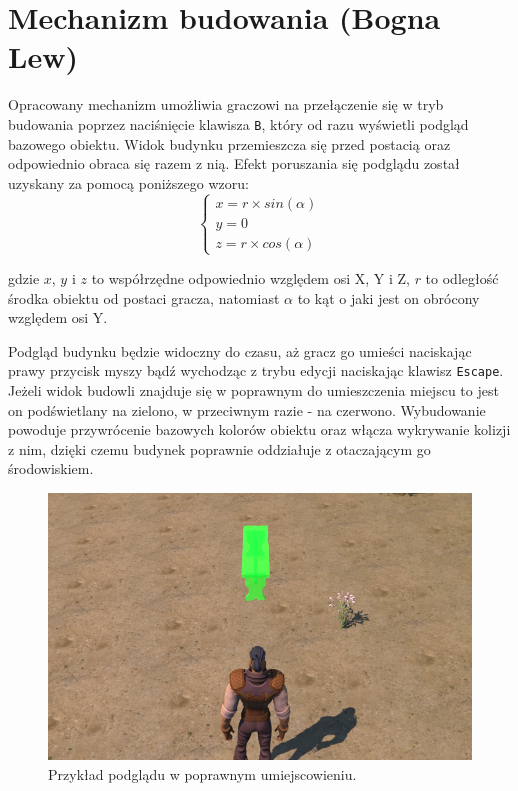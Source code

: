 \section{Mechanizm budowania (Bogna Lew)}\label{s:bud_impl}

Opracowany mechanizm umożliwia graczowi na przełączenie się w tryb budowania poprzez naciśnięcie klawisza \texttt{B}, który od razu
wyświetli podgląd bazowego obiektu. Widok budynku przemieszcza się przed postacią oraz odpowiednio obraca się razem z
nią. Efekt poruszania się podglądu został uzyskany za pomocą poniższego wzoru:
\begin{equation}
\begin{cases}
x = r \times sin(\alpha) \\
y = 0 \\
z = r \times cos(\alpha)
\end{cases}
\end{equation}

gdzie $x$, $y$ i $z$ to współrzędne odpowiednio względem osi X, Y i Z, $r$ to odległość środka obiektu od postaci
gracza, natomiast $\alpha$ to kąt o jaki jest on obrócony względem osi Y.

Podgląd budynku będzie widoczny do czasu, aż gracz go umieści naciskając prawy przycisk myszy bądź wychodząc z trybu
edycji naciskając klawisz \texttt{Escape}. Jeżeli widok budowli znajduje się w poprawnym do umieszczenia miejscu to jest on
podświetlany na zielono, w przeciwnym razie - na czerwono. Wybudowanie powoduje przywrócenie bazowych kolorów obiektu
oraz włącza wykrywanie kolizji z nim, dzięki czemu budynek poprawnie oddziałuje z otaczającym go środowiskiem.

\begin{figure}[h!]
    \centering
    \includegraphics[width=1\textwidth]{images/implementacja/mechanizm_budowania/poprawne.png}
    \caption{Przykład podglądu w poprawnym umiejscowieniu.}
\end{figure}
\FloatBarrier


